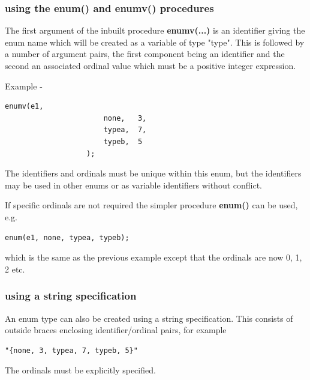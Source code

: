             \subsubsection{using the enum() and enumv() procedures}
                
                The first argument of the inbuilt procedure {\bf enumv(...)}
                is an identifier giving the enum name which will be created
                as a variable of type "type". This is followed by a number of
                argument pairs, the first component being an identifier
                and the second an associated ordinal value which must be
                a positive integer expression.  

                Example -
                \begin{lstlisting}[gobble=16, language=threepl]
                   enumv(e1,
                       none,   3,
                       typea,  7,
                       typeb,  5
                   );
                \end{lstlisting}
                The identifiers and ordinals must be unique within this
                enum, but the identifiers may be used in other enums
                or as variable identifiers without conflict.
                
                If specific ordinals are not required the simpler procedure
                {\bf enum()} can be used, e.g.
                \begin{lstlisting}[gobble=16, language=threepl]
                   enum(e1, none, typea, typeb);
                \end{lstlisting}
                which is the same as the previous example except that the
                ordinals are now 0, 1, 2 etc.
                
                
                
            \subsubsection{using a string specification}
            
                An enum type can also be created using a string specification.
                This consists of outside braces enclosing identifier/ordinal
                pairs, for example
                \begin{lstlisting}[gobble=16, language=threepl]
                   "{none, 3, typea, 7, typeb, 5}"
                \end{lstlisting}
                The ordinals must be explicitly specified.
                
